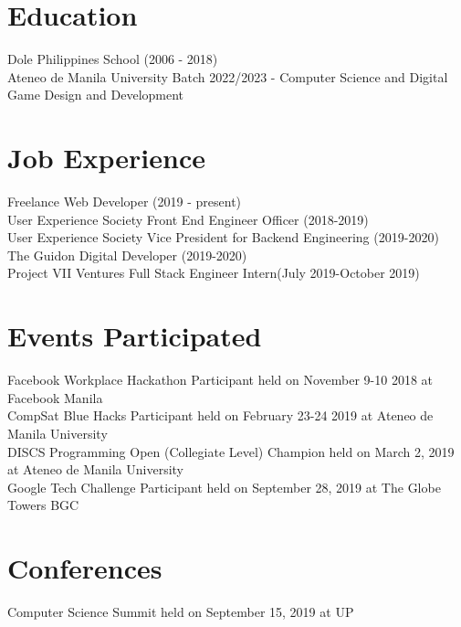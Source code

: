 \documentclass{article}
\begin{document}

    \section{Education}
    Dole Philippines School (2006 - 2018)\\
    Ateneo de Manila University Batch 2022/2023 - Computer Science and Digital Game Design and Development

    \section{Job Experience}
    Freelance Web Developer (2019 - present)\\
    User Experience Society Front End Engineer Officer (2018-2019)\\
    User Experience Society Vice President for Backend Engineering (2019-2020)\\
    The Guidon Digital Developer (2019-2020)\\
    Project VII Ventures Full Stack Engineer Intern(July 2019-October 2019)

    \section{Events Participated}

    Facebook Workplace Hackathon Participant held on November 9-10 2018 at Facebook Manila\\
    CompSat Blue Hacks Participant held on February 23-24 2019 at Ateneo de Manila University\\
    DISCS Programming Open (Collegiate Level) Champion held on March 2, 2019 at Ateneo de Manila University\\
    Google Tech Challenge Participant held on September 28, 2019 at The Globe Towers BGC
    
    \section{Conferences}
    Computer Science Summit held on September 15, 2019 at UP

    
\end{document}
